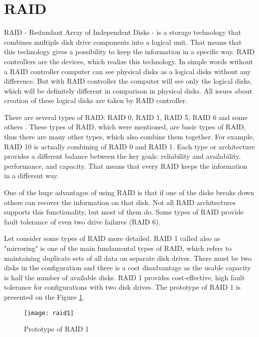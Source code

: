 \section{RAID}
RAID - Redundant Array of Independent Disks - is a storage technology that combines multiple disk drive components into a logical unit. That means that this technology gives a possibility to keep the information in a specific way. RAID controllers are the devices, which realize this technology. In simple words without a RAID controller computer can see physical disks as a logical disks without any difference. But with RAID controller the computer will see only the logical disks, which will be definitely different in comparison in physical disks. All issues about creation of these logical disks are taken by RAID controller.

There are several types of RAID: RAID 0, RAID 1, RAID 5, RAID 6 and some others \cite{which_raid}. These types of RAID, which were mentioned, are basic types of RAID, thus there are many other types, which also combine them together. For example, RAID 10 is actually combining of RAID 0 and RAID 1. Each type or architecture provides a different balance between the key goals: reliability and availability, performance, and capacity. That means that every RAID keeps the information in a different way. 

One of the huge advantages of using RAID is that if one of the disks breaks down others can recover the information on that disk. Not all RAID architectures supports this functionality, but most of them do. Some types of RAID provide fault tolerance of even two drive failures (RAID 6).

Let consider some types of RAID more detailed. RAID 1 called also as "mirroring" is one of the main fundamental types of RAID, which refers to maintaining duplicate sets of all data on separate disk drives. There must be two disks in the configuration and there is a cost disadvantage as the usable
capacity is half the number of available disks. RAID 1 provides cost-effective, high fault tolerance for configurations with two disk drives. The prototype of RAID 1 is presented on the Figure \ref{fig:raid1}.
\begin{figure}[h!]
\begin{center}
  \texttt{[image: raid1]}
\end{center}
  \caption{Prototype of RAID 1}
  \label{fig:raid1}
\end{figure}


